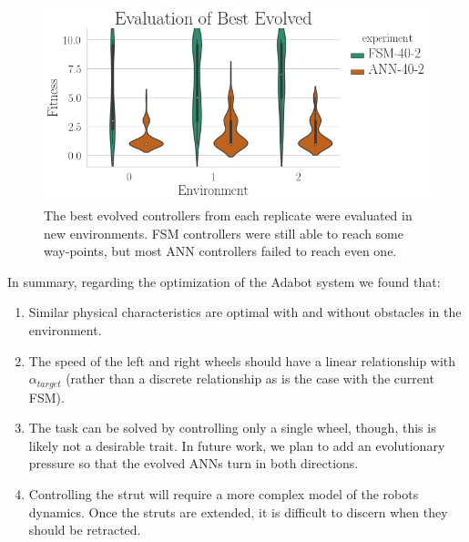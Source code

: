 \begin{figure}[!ht]
    \centering

    \includegraphics[width=\columnwidth]{figures/4-results/evaluation.png}

    \caption{The best evolved controllers from each replicate were evaluated in new environments. FSM controllers were still able to reach some way-points, but most ANN controllers failed to reach even one.}
    \label{fig:evaluation}

\end{figure}



In summary, regarding the optimization of the Adabot system we found that:

\begin{enumerate}

\item Similar physical characteristics are optimal with and without obstacles in the environment.

\item The speed of the left and right wheels should have a linear relationship with $\alpha_{\mathit{target}}$ (rather than a discrete relationship as is the case with the current FSM).

\item The task can be solved by controlling only a single wheel, though, this is likely not a desirable trait. In future work, we plan to add an evolutionary pressure so that the evolved ANNs turn in both directions.

\item Controlling the strut will require a more complex model of the robots dynamics. Once the struts are extended, it is difficult to discern when they should be retracted.

\end{enumerate}

